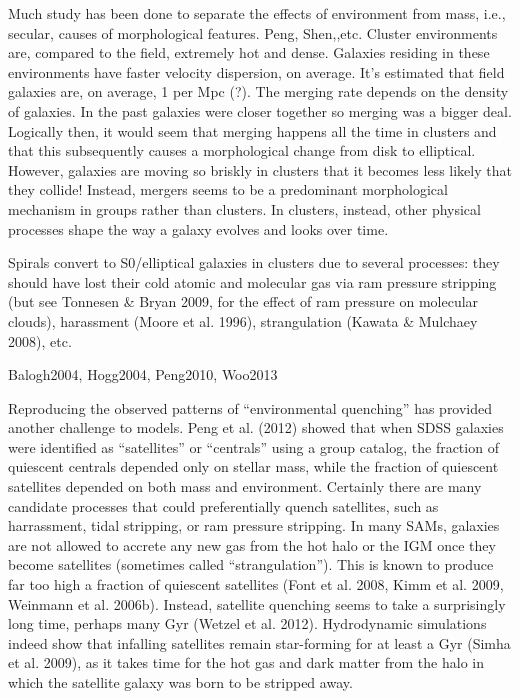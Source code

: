Much study has been done to separate the effects of environment from mass, i.e., secular, causes of morphological features. Peng, Shen,,etc. Cluster environments are, compared to the field, extremely hot and dense. Galaxies residing in these environments have faster velocity dispersion, on average.   It's estimated that field galaxies are, on average, 1 per Mpc (?). The merging rate depends on the density of galaxies. In the past galaxies were closer together so merging was a bigger deal. Logically then, it would seem that merging happens all the time in clusters and that this subsequently causes a morphological change from disk to elliptical. However, galaxies are moving so briskly in clusters that it becomes less likely that they collide! Instead, mergers seems to be a predominant morphological mechanism in groups rather than clusters. In clusters, instead, other physical processes shape the way a galaxy evolves and looks over time. 

Spirals convert to S0/elliptical galaxies in clusters due to several processes: they should have lost their cold atomic and molecular gas via ram pressure stripping (but see Tonnesen \& Bryan 2009, for the effect of ram
pressure on molecular clouds), harassment (Moore et al. 1996),
strangulation (Kawata \& Mulchaey 2008), etc.

Balogh2004, Hogg2004, Peng2010, Woo2013

Reproducing the observed patterns of “environmental quenching” has provided another challenge to models. Peng et al. (2012) showed that when SDSS galaxies were identified as “satellites” or “centrals” using a group catalog, the fraction of quiescent centrals depended only on stellar mass, while the fraction of quiescent satellites depended on both mass and environment. Certainly there are many candidate processes that could preferentially quench
satellites, such as harrassment, tidal stripping, or ram pressure stripping. In many SAMs, galaxies are not allowed to accrete any new gas from the hot halo or the IGM once they become satellites (sometimes called “strangulation”). This is known to produce far too high a fraction of quiescent satellites (Font et al. 2008, Kimm et al. 2009, Weinmann et al.
2006b). Instead, satellite quenching seems to take a surprisingly long time, perhaps many Gyr (Wetzel et al. 2012). Hydrodynamic simulations indeed show that infalling satellites remain star-forming for at least a Gyr (Simha et al. 2009), as it takes time for the hot gas and dark matter from the halo in which the satellite galaxy was born to be stripped away.

